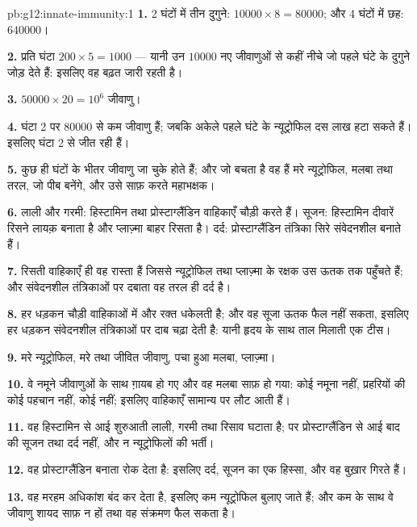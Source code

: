 \begin{solution}{pb:g12:innate-immunity:1}
\textbf{1.} 2 घंटों में तीन दुगुने: $\num{10000} \times 8 =
\num{80000}$; और 4 घंटों में छह: $\num{640000}$।

\textbf{2.} प्रति घंटा $200 \times 5 = 1000$ --- यानी उन
$\num{10000}$ नए जीवाणुओं से कहीं नीचे जो पहले घंटे के दुगुने जोड़ देते हैं:
इसलिए वह बढ़त जारी रहती है।

\textbf{3.} $\num{50000} \times 20 = 10^6$ जीवाणु।

\textbf{4.} घंटा 2 पर $\num{80000}$ से कम जीवाणु हैं; जबकि अकेले पहले घंटे
के न्यूट्रोफिल दस लाख हटा सकते हैं। इसलिए  घंटा 2 से जीत रही
हैं।

\textbf{5.} कुछ ही घंटों के भीतर जीवाणु जा चुके होते हैं; और जो बचता है वह
हैं मरे न्यूट्रोफिल, मलबा तथा तरल, जो पीब बनेंगे, और उसे साफ़ करते महाभक्षक।

\textbf{6.} लाली और गरमी: हिस्टामिन तथा प्रोस्टाग्लैंडिन वाहिकाएँ चौड़ी
करते हैं। सूजन: हिस्टामिन दीवारें रिसने लायक़ बनाता है और प्लाज़्मा बाहर
रिसता है। दर्द: प्रोस्टाग्लैंडिन तंत्रिका सिरे संवेदनशील बनाते हैं।

\textbf{7.} रिसती वाहिकाएँ ही वह रास्ता हैं जिससे न्यूट्रोफिल तथा
प्लाज़्मा के रक्षक  उस ऊतक तक पहुँचते हैं; और संवेदनशील तंत्रिकाओं
पर दबाता वह तरल ही दर्द है।

\textbf{8.} हर धड़कन चौड़ी वाहिकाओं में और रक्त धकेलती है; और वह सूजा ऊतक
फैल नहीं सकता, इसलिए हर धड़कन संवेदनशील तंत्रिकाओं पर दाब चढ़ा देती है: यानी
हृदय के साथ ताल मिलाती एक टीस।

\textbf{9.} मरे न्यूट्रोफिल, मरे तथा जीवित जीवाणु, पचा हुआ मलबा, प्लाज़्मा।

\textbf{10.} वे नमूने जीवाणुओं के साथ ग़ायब हो गए और वह मलबा साफ़ हो गया:
कोई नमूना नहीं, प्रहरियों की कोई पहचान नहीं, कोई  नहीं; इसलिए
वाहिकाएँ सामान्य पर लौट आती हैं।

\textbf{11.} वह हिस्टामिन से आई शुरुआती लाली, गरमी तथा रिसाव घटाता है; पर
प्रोस्टाग्लैंडिन से आई बाद की सूजन तथा दर्द नहीं, और न न्यूट्रोफिलों की
भर्ती।

\textbf{12.} वह प्रोस्टाग्लैंडिन बनाता  रोक देता है: इसलिए दर्द,
सूजन का एक हिस्सा, और वह बुख़ार गिरते हैं।

\textbf{13.} वह मरहम अधिकांश  बंद कर देता है, इसलिए कम न्यूट्रोफिल
बुलाए जाते हैं; और कम  के साथ वे जीवाणु शायद साफ़ न हों तथा वह
संक्रमण फैल सकता है।


\end{solution}
